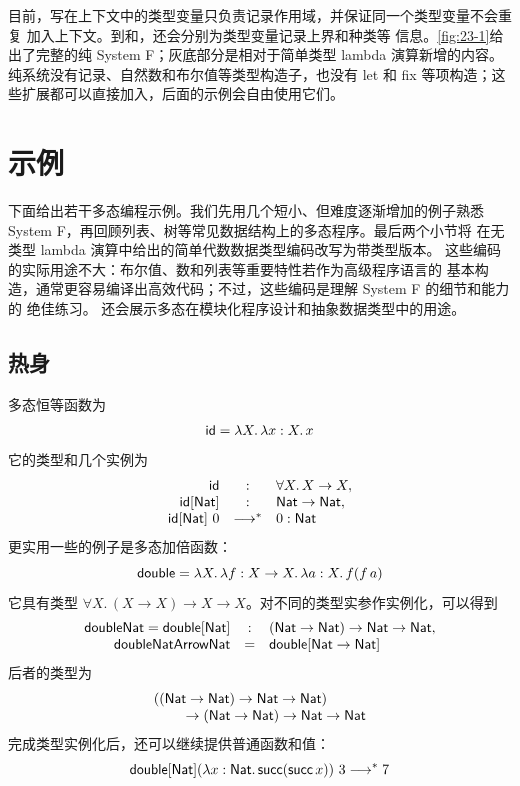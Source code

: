 目前，写在上下文中的类型变量只负责记录作用域，并保证同一个类型变量不会重复
加入上下文。到和，还会分别为类型变量记录上界和种类等
信息。\cref{fig:23-1}给出了完整的纯 System F；灰底部分是相对于简单类型 lambda
演算新增的内容。纯系统没有记录、自然数和布尔值等类型构造子，也没有 let 和 fix
等项构造；这些扩展都可以直接加入，后面的示例会自由使用它们。

\section{示例}
\label{sec:23.4}

下面给出若干多态编程示例。我们先用几个短小、但难度逐渐增加的例子熟悉
System F，再回顾列表、树等常见数据结构上的多态程序。最后两个小节将
在无类型 lambda 演算中给出的简单代数数据类型编码改写为带类型版本。
这些编码的实际用途不大：布尔值、数和列表等重要特性若作为高级程序语言的
基本构造，通常更容易编译出高效代码；不过，这些编码是理解 System F 的细节和能力的
绝佳练习。
还会展示多态在模块化程序设计和抽象数据类型中的用途。

\subsection*{热身}

多态恒等函数为
\[
\mathsf{id}=\lambda X.\,\lambda x:X.\,x
\]
它的类型和几个实例为
\[
\begin{array}{rcl}
\taplterm{id}&:&\forall X.\,X\to X,\\
\taplterm{id}[\tapltype{Nat}]&:&\tapltype{Nat}\to\tapltype{Nat},\\
\taplterm{id}[\tapltype{Nat}]\ 0&\longrightarrow^*&0:\tapltype{Nat}
\end{array}
\]
更实用一些的例子是多态加倍函数：
\[
\mathsf{double}
=\lambda X.\,\lambda f:X\to X.\,\lambda a:X.\,f(f\,a)
\]
它具有类型
\(
\forall X.\,(X\to X)\to X\to X
\)。对不同的类型实参作实例化，可以得到
\[
\begin{array}{rcl}
\mathsf{doubleNat}=\mathsf{double}[\mathsf{Nat}]
&:&(\mathsf{Nat}\to\mathsf{Nat})\to\mathsf{Nat}\to\mathsf{Nat},\\
\mathsf{doubleNatArrowNat}
&=&\mathsf{double}[\mathsf{Nat}\to\mathsf{Nat}]
\end{array}
\]
后者的类型为
\[
\begin{aligned}
&((\mathsf{Nat}\to\mathsf{Nat})\to
  \mathsf{Nat}\to\mathsf{Nat})\\[-1mm]
&\qquad\to(\mathsf{Nat}\to\mathsf{Nat})
  \to\mathsf{Nat}\to\mathsf{Nat}
\end{aligned}
\]
完成类型实例化后，还可以继续提供普通函数和值：
\[
\mathsf{double}[\mathsf{Nat}]
  (\lambda x:\mathsf{Nat}.\,\mathsf{succ}(\mathsf{succ}\,x))\ 3
\longrightarrow^*7
\]

